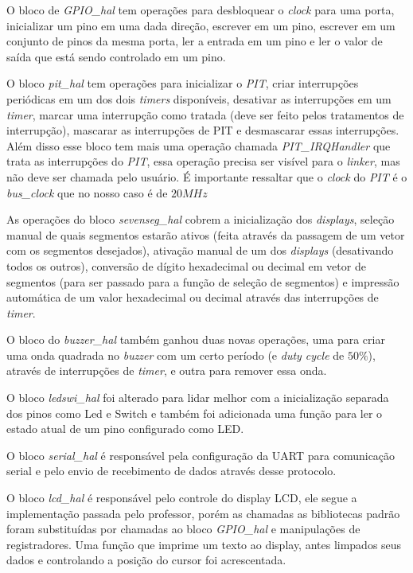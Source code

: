 \documentclass{article}
\begin{document}
O bloco de \textit{GPIO\_hal} tem operações para desbloquear o \textit{clock} para uma porta, inicializar um pino em uma dada direção, escrever em um pino, escrever em um conjunto de pinos da mesma porta, ler a entrada em um pino e ler o valor de saída que está sendo controlado em um pino.

O bloco \textit{pit\_hal} tem operações para inicializar o \textit{PIT}, criar interrupções periódicas em um dos dois \textit{timers} disponíveis, desativar as interrupções em um \textit{timer}, marcar uma interrupção como tratada (deve ser feito pelos tratamentos de interrupção), mascarar as interrupções de PIT e desmascarar essas interrupções. Além disso esse bloco tem mais uma operação chamada \textit{PIT\_IRQHandler }que trata as interrupções do \textit{PIT}, essa operação precisa ser visível para o \textit{linker}, mas não deve ser chamada pelo usuário. É importante ressaltar que o \textit{clock} do \textit{PIT} é o \textit{bus\_clock} que no nosso caso é de $20MHz$

As operações do bloco \textit{sevenseg\_hal} cobrem a inicialização dos \textit{displays}, seleção manual de quais segmentos estarão ativos (feita através da passagem de um vetor com os segmentos desejados), ativação manual de um dos \textit{displays} (desativando todos os outros), conversão de dígito hexadecimal ou decimal em vetor de segmentos (para ser passado para a função de seleção de segmentos) e impressão automática de um valor hexadecimal ou decimal através das interrupções de \textit{timer}.

O bloco do \textit{buzzer\_hal} também ganhou duas novas operações, uma para criar uma onda quadrada no \textit{buzzer} com um certo período (e \textit{duty cycle} de $50\%$), através de interrupções de \textit{timer}, e outra para remover essa onda.

O bloco \textit{ledswi\_hal} foi alterado para lidar melhor com a inicialização separada dos pinos como Led e Switch e também foi adicionada uma função para ler o estado atual de um pino configurado como LED.

O bloco \textit{serial\_hal} é responsável pela configuração da UART para comunicação serial e pelo envio de recebimento de dados através desse protocolo.

O bloco \textit{lcd\_hal} é responsável pelo controle do display LCD, ele segue a implementação passada pelo professor, porém as chamadas as bibliotecas padrão foram substituídas por chamadas ao bloco \textit{GPIO\_hal} e manipulações de registradores. Uma função que imprime um texto ao display, antes limpados seus dados e controlando a posição do cursor foi acrescentada.
\end{document}
